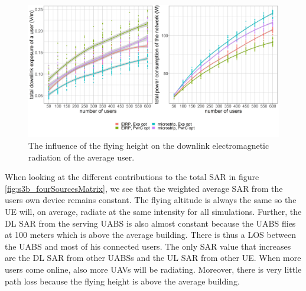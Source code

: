 \begin{figure}[h!]
  \includegraphics[width=\textwidth]{../results/s3/uvsdlAndPc.png}
  \caption{The influence of the flying height on the downlink electromagnetic radiation of the average user.}
  \label{fig:s3b_dlAndPC}
\end{figure}

When looking at the different contributions to the total \gls{SAR} in figure \ref{fig:s3b_fourSourcesMatrix}, 
we see that the weighted average 
\gls{SAR} from the users own device remains constant. The flying altitude is always the same so the
 \gls{UE} will, on average, radiate at the same intensity for all simulations.
 Further, the \gls{DL} \gls{SAR} from the serving \gls{UABS} is also almost constant because the \gls{UABS} flies at 100 meters which is
above the average building. There is thus a \gls{LOS} between the \gls{UABS} and most of his connected users.
The only \gls{SAR} value that increases are the \gls{DL} \gls{SAR} from other \gls{UABS}s and the \gls{UL} \gls{SAR} from other \gls{UE}. 
When more users come online, also more \gls{UAV}s will be radiating. Moreover, there is very little path loss because the flying height is above the average building.

